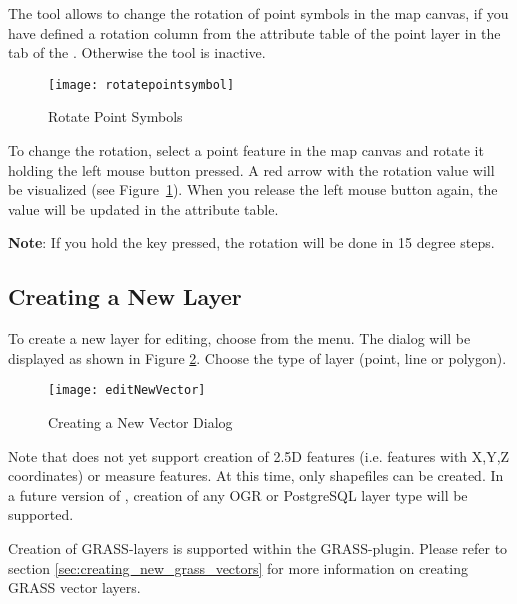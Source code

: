 
The  tool 
allows to change the rotation of point symbols in the map canvas, if 
you have defined a rotation column from the attribute table of the point 
layer in the  tab of the . 
Otherwise the tool is inactive.

\begin{figure}[ht]
   \centering
   \texttt{[image: rotatepointsymbol]}
   \caption{Rotate Point Symbols \nixcaption}\label{fig:rotatepoint}
\end{figure}

To change the rotation, select a point feature in the map canvas and rotate 
it holding the left mouse button pressed. A red arrow with the rotation value 
will be visualized (see Figure~\ref{fig:rotatepoint}). When you release the 
left mouse button again, the value will be updated in the attribute table. 

\textbf{Note}: If you hold the  key pressed, the rotation will be done 
in 15 degree steps.

\subsection{Creating a New Layer}\label{sec:create shape}

To create a new layer for editing, choose  from the
 menu. 
The  dialog will be displayed as
shown in Figure \ref{fig:newvectorlayer}. Choose the type of layer (point,
line or polygon).

\begin{figure}[ht]
   \centering
   \texttt{[image: editNewVector]}
   \caption{Creating a New Vector Dialog \nixcaption}\label{fig:newvectorlayer}
\end{figure}

Note that \qg does not yet support creation of 2.5D
features (i.e. features with X,Y,Z coordinates) or measure features. At this
time, only shapefiles can be created. In a future version of \qg, creation of
any OGR or PostgreSQL layer type will be supported. 

Creation of GRASS-layers is supported within the GRASS-plugin. Please refer to section
\ref{sec:creating_new_grass_vectors} for more information on creating GRASS vector 
layers.

